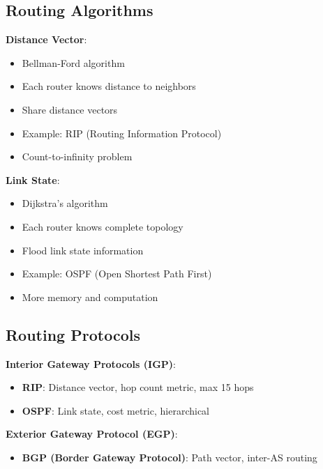 \documentclass[12pt,a4paper]{report}
\begin{document}
\subsection{Routing Algorithms}
\begin{concept}
\textbf{Distance Vector}:
\begin{itemize}
    \item Bellman-Ford algorithm
    \item Each router knows distance to neighbors
    \item Share distance vectors
    \item Example: RIP (Routing Information Protocol)
    \item Count-to-infinity problem
\end{itemize}

\textbf{Link State}:
\begin{itemize}
    \item Dijkstra's algorithm
    \item Each router knows complete topology
    \item Flood link state information
    \item Example: OSPF (Open Shortest Path First)
    \item More memory and computation
\end{itemize}
\end{concept}

\subsection{Routing Protocols}
\begin{concept}
\textbf{Interior Gateway Protocols (IGP)}:
\begin{itemize}
    \item \textbf{RIP}: Distance vector, hop count metric, max 15 hops
    \item \textbf{OSPF}: Link state, cost metric, hierarchical
\end{itemize}

\textbf{Exterior Gateway Protocol (EGP)}:
\begin{itemize}
    \item \textbf{BGP (Border Gateway Protocol)}: Path vector, inter-AS routing
\end{itemize}
\end{concept}
\end{document}
